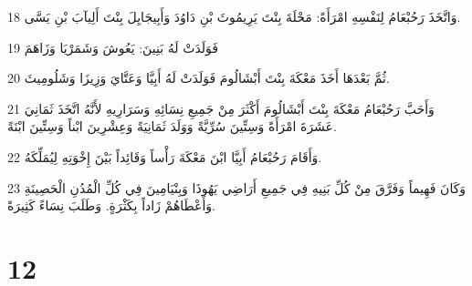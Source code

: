 \par 18 وَاتَّخَذَ رَحُبْعَامُ لِنَفْسِهِ امْرَأَةً: مَحْلَةَ بِنْتَ يَرِيمُوثَ بْنِ دَاوُدَ وَأَبِيجَايِلَ بِنْتَ أَلِيآبَ بْنِ يَسَّى.
\par 19 فَوَلَدَتْ لَهُ بَنِينَ: يَعُوشَ وَشَمَرْيَا وَزَاهَمَ
\par 20 ثُمَّ بَعْدَهَا أَخَذَ مَعْكَةَ بِنْتَ أَبْشَالُومَ فَوَلَدَتْ لَهُ أَبِيَّا وَعَتَّايَ وَزِيزَا وَشَلُومِيثَ.
\par 21 وَأَحَبَّ رَحُبْعَامُ مَعْكَةَ بِنْتَ أَبْشَالُومَ أَكْثَرَ مِنْ جَمِيعِ نِسَائِهِ وَسَرَارِيهِ لأَنَّهُ اتَّخَذَ ثَمَانِيَ عَشَرَةَ امْرَأَةً وَسِتِّينَ سُرِّيَّةً وَوَلَدَ ثَمَانِيَةً وَعِشْرِينَ ابْناً وَسِتِّينَ ابْنَةً.
\par 22 وَأَقَامَ رَحُبْعَامُ أَبِيَّا ابْنَ مَعْكَةَ رَأْساً وَقَائِداً بَيْنَ إِخْوَتِهِ لِيُمَلِّكَهُ.
\par 23 وَكَانَ فَهِيماً وَفَرَّقَ مِنْ كُلِّ بَنِيهِ فِي جَمِيعِ أَرَاضِي يَهُوذَا وَبِنْيَامِينَ فِي كُلِّ الْمُدُنِ الْحَصِينَةِ وَأَعْطَاهُمْ زَاداً بِكَثْرَةٍ. وَطَلَبَ نِسَاءً كَثِيرَةً.

\chapter{12}

